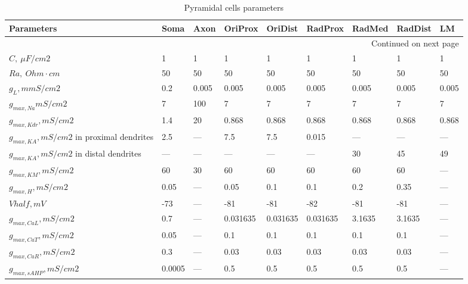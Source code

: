 \begin{longtable}{lllllllll}
\caption{Pyramidal cells parameters}\label{ca1_pyramidal_cell_parameters}\\
\toprule
Parameters &     Soma &   Axon &   OriProx &   OriDist &   RadProx &  RadMed & RadDist &     LM \\
\midrule
\endhead
\midrule
\multicolumn{9}{r}{{Continued on next page}} \\
\midrule
\endfoot

\bottomrule
\endlastfoot
$C, \ \mu F/cm2$ &        1 &      1 &         1 &         1 &         1 &       1 &       1 &      1 \\
$Ra, \ Ohm \cdot cm$ &       50 &     50 &        50 &        50 &        50 &      50 &      50 &     50 \\
$g_L,mmS/cm2$ &      0.2 &  0.005 &     0.005 &     0.005 &     0.005 &   0.005 &   0.005 &  0.005 \\
$g_{max, Na} mS/cm2$ &        7 &    100 &         7 &         7 &         7 &       7 &       7 &      7 \\
$g_{max, Kdr}, mS/cm2$ &      1.4 &     20 &     0.868 &     0.868 &     0.868 &   0.868 &   0.868 &  0.868 \\
$ g_{max, KA}, mS/cm2$ in proximal dendrites&      2.5 &    --- &       7.5 &       7.5 &     0.015 &     --- &     --- &    --- \\
$g_{max, KA}, mS/cm2$ in distal dendrites &      --- &    --- &       --- &       --- &       --- &      30 &      45 &     49 \\
$g_{max, KM}, mS/cm2 $ &       60 &     30 &        60 &        60 &        60 &      60 &      60 &    --- \\
$ g_{max, H}, mS/cm2 $ &     0.05 &    --- &      0.05 &       0.1 &       0.1 &     0.2 &    0.35 &    --- \\
$ Vhalf, mV$ &      -73 &    --- &       -81 &       -81 &       -82 &     -81 &     -81 &    --- \\
$g_{max, CaL}, mS/cm2 $ &      0.7 &    --- &  0.031635 &  0.031635 &  0.031635 &  3.1635 &  3.1635 &    --- \\
$g_{max, CaT}, mS/cm2 $ &     0.05 &    --- &       0.1 &       0.1 &       0.1 &     0.1 &     0.1 &    --- \\
$g_{max, CaR}, mS/cm2 $ &      0.3 &    --- &      0.03 &      0.03 &      0.03 &    0.03 &    0.03 &    --- \\
$g_{max, sAHP}, mS/cm2 $ &   0.0005 &    --- &       0.5 &       0.5 &       0.5 &     0.5 &     0.5 &    --- \\

\end{longtable}
